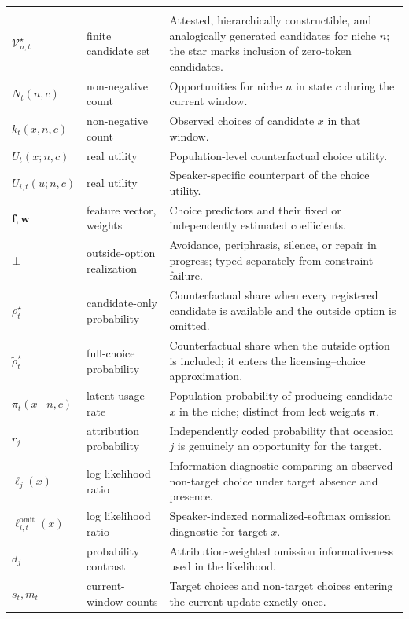 \begin{longtable}{@{}>{\raggedright\arraybackslash}p{}
  >{\raggedright\arraybackslash}p{}
  >{\raggedright\arraybackslash}p{}@{}}
\multicolumn{3}{@{}l}{\textsc{Opportunity, choice, and observation}}\\[2pt]
$\mathcal V_{n,t}^{\star}$ & finite candidate set & Attested, hierarchically constructible, and analogically generated candidates for niche $n$; the star marks inclusion of zero-token candidates. \\
$N_t(n,c)$ & non-negative count & Opportunities for niche $n$ in state $c$ during the current window. \\
$k_t(x,n,c)$ & non-negative count & Observed choices of candidate $x$ in that window. \\
$U_t(x;n,c)$ & real utility & Population-level counterfactual choice utility. \\
$U_{i,t}(u;n,c)$ & real utility & Speaker-specific counterpart of the choice utility. \\
$\mathbf f,\mathbf w$ & feature vector, weights & Choice predictors and their fixed or independently estimated coefficients. \\
$\bot$ & outside-option realization & Avoidance, periphrasis, silence, or repair in progress; typed separately from constraint failure. \\
$\rho_t^\star$ & candidate-only probability & Counterfactual share when every registered candidate is available and the outside option is omitted. \\
$\widetilde\rho_t^\star$ & full-choice probability & Counterfactual share when the outside option is included; it enters the licensing--choice approximation. \\
$\pi_t(x\mid n,c)$ & latent usage rate & Population probability of producing candidate $x$ in the niche; distinct from lect weights $\boldsymbol\pi$. \\
$r_j$ & attribution probability & Independently coded probability that occasion $j$ is genuinely an opportunity for the target. \\
$\ell_j(x)$ & log likelihood ratio & Information diagnostic comparing an observed non-target choice under target absence and presence. \\
$\ell^{\mathrm{omit}}_{i,t}(x)$ & log likelihood ratio & Speaker-indexed normalized-softmax omission diagnostic for target $x$. \\
$d_j$ & probability contrast & Attribution-weighted omission informativeness used in the likelihood. \\
$s_t,m_t$ & current-window counts & Target choices and non-target choices entering the current update exactly once. \\

\end{longtable}

